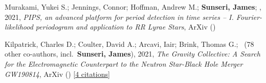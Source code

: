 \item Murakami, Yukei S.; Jennings, Connor; Hoffman, Andrew M.; \textbf{Sunseri, James}; \etal, 2021, \emph{PIPS, an advanced platform for period detection in time series -- I. Fourier-likelihood periodogram and application to RR Lyrae Stars}, ArXiv ()

\item Kilpatrick, Charles D.; Coulter, David A.; Arcavi, Iair; Brink, Thomas G.; \etal\ ({78} other co-authors, incl.\ \textbf{Sunseri, James}), 2021, \emph{The Gravity Collective: A Search for the Electromagnetic Counterpart to the Neutron Star-Black Hole Merger GW190814}, ArXiv () [\href{https://ui.adsabs.harvard.edu/abs/2021arXiv210606897K}{4 citations}]